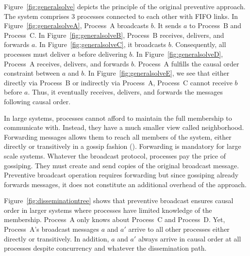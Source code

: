 Figure~\ref{fig:generalsolve} depicts the principle of the original preventive
approach. The system comprises 3 processes connected to each other with FIFO
links.  In Figure~\ref{fig:generalsolveA}, Process~A broadcasts $b$. It sends
$a$ to Process~B and Process~C. In Figure~\ref{fig:generalsolveB}, Process~B
receives, delivers, and forwards $a$. In Figure~\ref{fig:generalsolveC}, it
broadcasts $b$. Consequently, all processes must deliver $a$ before delivering
$b$. In Figure~\ref{fig:generalsolveD}, Process~A receives, delivers, and
forwards $b$. Process~A fulfills the causal order constraint between $a$ and
$b$. In Figure~\ref{fig:generalsolveE}, we see that either directly via
Process~B or indirectly via Process~A, Process~C cannot receive $b$ before
$a$. Thus, it eventually receives, delivers, and forwards the messages following
causal order.


In large systems, processes cannot afford to maintain the full membership to
communicate with. Instead, they have a much smaller view called
neighborhood. Forwarding messages allows them to reach all members of the
system, either directly or transitively in a gossip fashion (\REF). Forwarding
is mandatory for large scale systems.  Whatever the broadcast protocol,
processes pay the price of gossiping. They must create and send copies of the
original broadcast message. Preventive broadcast operation requires forwarding
but since gossiping already forwards messages, it does not constitute an
additional overhead of the approach.

Figure~\ref{fig:disseminationtree} shows that preventive broadcast ensures
causal order in larger systems where processes have limited knowledge of
the membership.  Process~A only knows about Process~C and Process~D.  Yet,
Process~A's broadcast messages $a$ and $a'$ arrive to all other processes either
directly or transitively. In addition, $a$ and $a'$ always arrive in causal
order at all processes despite concurrency and whatever the dissemination path.

